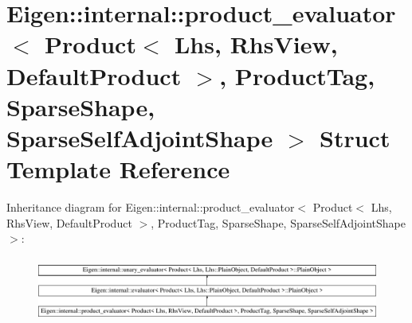 \hypertarget{struct_eigen_1_1internal_1_1product__evaluator_3_01_product_3_01_lhs_00_01_rhs_view_00_01_defaule3daa34d3e750fc1a34e5c28fcdbf893}{}\section{Eigen\+::internal\+::product\+\_\+evaluator$<$ Product$<$ Lhs, Rhs\+View, Default\+Product $>$, Product\+Tag, Sparse\+Shape, Sparse\+Self\+Adjoint\+Shape $>$ Struct Template Reference}
\label{struct_eigen_1_1internal_1_1product__evaluator_3_01_product_3_01_lhs_00_01_rhs_view_00_01_defaule3daa34d3e750fc1a34e5c28fcdbf893}
Inheritance diagram for Eigen\+::internal\+::product\+\_\+evaluator$<$ Product$<$ Lhs, Rhs\+View, Default\+Product $>$, Product\+Tag, Sparse\+Shape, Sparse\+Self\+Adjoint\+Shape $>$\+:\begin{figure}[H]
\begin{center}
\leavevmode
\includegraphics[height=2.162162cm]{struct_eigen_1_1internal_1_1product__evaluator_3_01_product_3_01_lhs_00_01_rhs_view_00_01_defaule3daa34d3e750fc1a34e5c28fcdbf893}
\end{center}
\end{figure}

